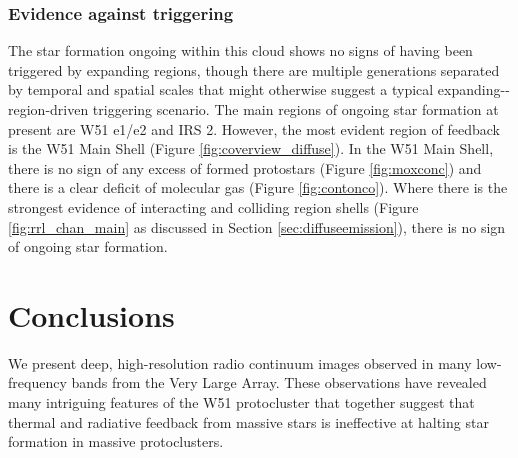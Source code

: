 \subsubsection{Evidence against triggering}
The star formation ongoing within this cloud shows no signs of having been
triggered by expanding \hii regions, though there are multiple generations
separated by temporal and spatial scales that might otherwise suggest a typical
expanding-\hii-region-driven triggering
scenario.  The main regions of ongoing star formation at present are W51 e1/e2
and IRS 2.  However, the most evident region of feedback is the W51 Main Shell
(Figure \ref{fig:coverview_diffuse}).  In the W51 Main Shell, there is no sign
of any excess of formed protostars (Figure \ref{fig:moxconc}) and there is a
clear deficit of molecular gas (Figure \ref{fig:contonco}).  Where there is the
strongest evidence of interacting and colliding \hii region shells (Figure
\ref{fig:rrl_chan_main} as discussed in Section \ref{sec:diffuseemission}),
there is no sign of ongoing star formation.


\section{Conclusions}
\label{sec:conclusion}
We present deep, high-resolution radio continuum images observed in many
low-frequency bands from the Very Large Array.  These observations have
revealed many intriguing features of the W51 protocluster that together
suggest that thermal and radiative feedback from massive stars is ineffective
at halting star formation in massive protoclusters.

